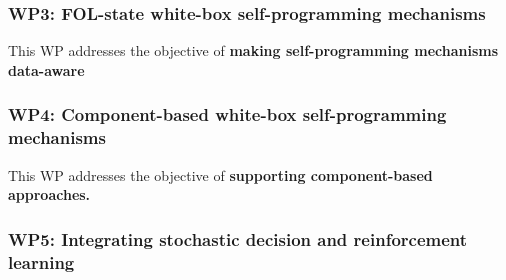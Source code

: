 

\subsubsection*{WP3: FOL-state white-box self-programming mechanisms}
This WP addresses the objective of  \textbf{making self-programming mechanisms data-aware}





\subsubsection*{WP4: Component-based  white-box self-programming mechanisms}
This WP addresses the objective of  \textbf{supporting component-based approaches.} 



\subsubsection*{WP5: Integrating stochastic decision and reinforcement learning} 

